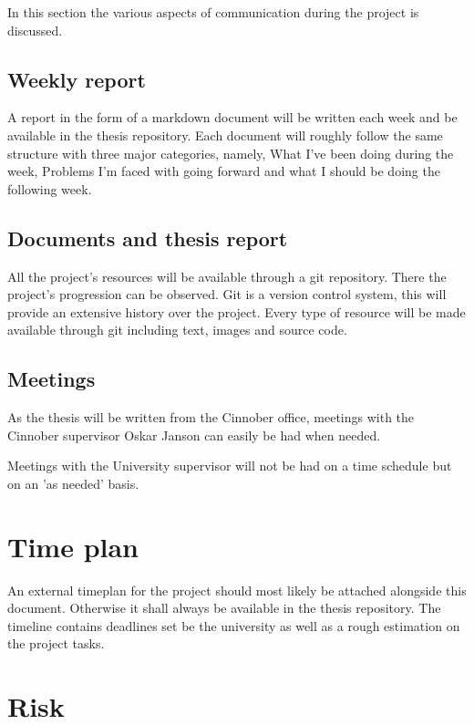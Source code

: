\documentclass[10pt, titlepage, oneside, a4paper]{article}
\begin{document}
In this section the various aspects of communication during the project is discussed.

\subsection{Weekly report}

A report in the form of a markdown document will be written each week and be available in the thesis repository\cite{repository:me:thesis}. Each document will roughly follow the same structure with three major categories, namely, What I've been doing during the week, Problems I'm faced with going forward and what I should be doing the following week.

\subsection{Documents and thesis report}

All the project's resources will be available through a git repository\cite{repository:me:thesis}. There the project's progression can be observed. Git is a version control system, this will provide an extensive history over the project. Every type of resource will be made available through git including text, images and source code. 

\subsection{Meetings}

As the thesis will be written from the Cinnober office, meetings with the Cinnober supervisor Oskar Janson can easily be had when needed.

Meetings with the University supervisor will not be had on a time schedule but on an 'as needed' basis.

\section{Time plan}

An external timeplan for the project should most likely be attached alongside this document. Otherwise it shall always be available in the thesis repository\cite{repository:me:thesis}. The timeline contains deadlines set be the university as well as a rough estimation on the project tasks.

\section{Risk}
\end{document}
